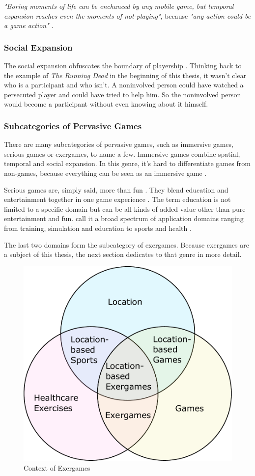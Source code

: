 \emph{"Boring moments of life can be enchanced by any mobile game, but temporal expansion reaches even the moments of not-playing"}, because \emph{"any action could be a game action"} \citep{montola2005exploring}.

\subsubsection{Social Expansion}
The social expansion obfuscates the boundary of playership \citep{montola2005exploring}. Thinking back to the example of \emph{The Running Dead} in the beginning of this thesis, it wasn't clear who is a participant and who isn't. A noninvolved person could have watched a persecuted player and could have tried to help him. So the noninvolved person would become a participant without even knowing about it himself.

\subsubsection{Subcategories of Pervasive Games}
There are many subcategories of pervasive games, such as immersive games, serious games or exergames, to name a few. Immersive games combine spatial, temporal and social expansion. In this genre, it's hard to differentiate games from non-games, because everything can be seen as an immersive game \citep{mcgonigal2003}.

Serious games are, simply said, more than fun \citep{sawyer2008serious}. They blend education and entertainment together in one game experience \citep{ritterfeld2009serious}. The term education is not limited to a specific domain but can be all kinds of added value other than pure entertainment and fun. \citeauthor{gobel2010serious} call it a broad spectrum of application domains ranging from training, simulation and education to sports and health \citep{gobel2010serious}.

The last two domains form the subcategory of exergames. Because exergames are a subject of this thesis, the next section dedicates to that genre in more detail.

\begin{figure}[bth]
  \centering
        \includegraphics[width=.55\linewidth]{gfx/exergame_context}
        \caption{Context of Exergames}
        \label{fig:exergameContext}
\end{figure}

